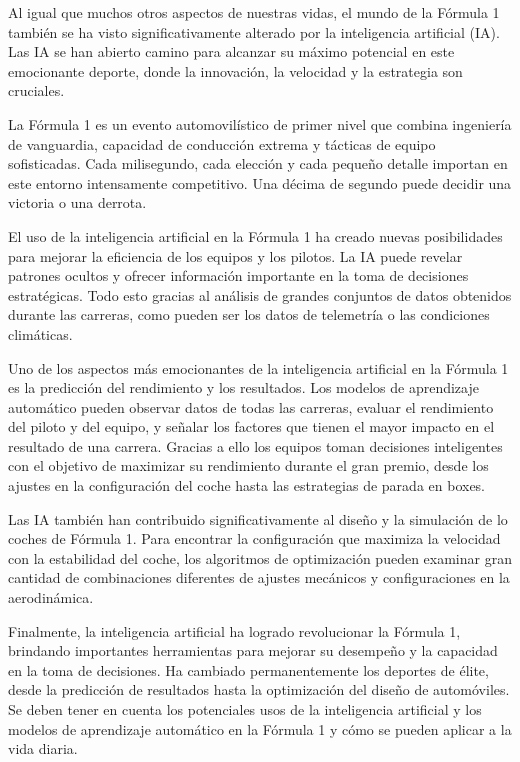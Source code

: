
Al igual que muchos otros aspectos de nuestras vidas, el mundo de la Fórmula 1 también se ha visto significativamente alterado por la inteligencia artificial (IA). Las IA se han abierto camino para alcanzar su máximo potencial en este emocionante deporte, donde la innovación, la velocidad y la estrategia son cruciales.

La Fórmula 1 es un evento automovilístico de primer nivel que combina ingeniería de vanguardia, capacidad de conducción extrema y tácticas de equipo sofisticadas. Cada milisegundo, cada elección y cada pequeño detalle importan en este entorno intensamente competitivo. Una décima de segundo puede decidir una victoria o una derrota.

El uso de la inteligencia artificial en la Fórmula 1 ha creado nuevas posibilidades para mejorar la eficiencia de los equipos y los pilotos. La IA puede revelar patrones ocultos y ofrecer información importante en la toma de decisiones estratégicas. Todo esto gracias al análisis de grandes conjuntos de datos obtenidos durante las carreras, como pueden ser los datos de telemetría o las condiciones climáticas.

Uno de los aspectos más emocionantes de la inteligencia artificial en la Fórmula 1 es la predicción del rendimiento y los resultados. Los modelos de aprendizaje automático pueden observar datos de todas las carreras, evaluar el rendimiento del piloto y del equipo, y señalar los factores que tienen el mayor impacto en el resultado de una carrera. Gracias a ello los equipos toman decisiones inteligentes con el objetivo de maximizar su rendimiento durante el gran premio, desde los ajustes en la configuración del coche hasta las estrategias de parada en boxes.

Las IA también han contribuido significativamente al diseño y la simulación de lo coches de Fórmula 1. Para encontrar la configuración que maximiza la velocidad con la estabilidad del coche, los algoritmos de optimización pueden examinar gran cantidad de combinaciones diferentes de ajustes mecánicos y configuraciones en la aerodinámica.

Finalmente, la inteligencia artificial ha logrado revolucionar la Fórmula 1, brindando importantes herramientas para mejorar su desempeño y la capacidad en la toma de decisiones. Ha cambiado permanentemente los deportes de élite, desde la predicción de resultados hasta la optimización del diseño de automóviles. Se deben tener en cuenta los potenciales usos de la inteligencia artificial y los modelos de aprendizaje automático en la Fórmula 1 y cómo se pueden aplicar a la vida diaria.

